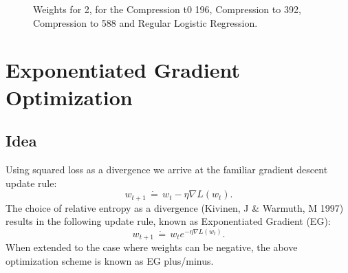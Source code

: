 \documentclass{asaproc}
\begin{document}
\begin{figure}[h!]
	\centering
	\caption{\enspace Weights for 2, for the Compression t0 196, Compression to 392, Compression to 588 and Regular Logistic Regression.}
	\label{fig5} 
\end{figure}

\section*{Exponentiated Gradient Optimization}

\subsection*{Idea}

Using squared loss as a divergence we arrive at the familiar gradient descent update rule:
$$ w_{t+1} \, \dot{=} \, w_t - \eta \nabla L(w_t). $$
The choice of relative entropy as a divergence (Kivinen, J \& Warmuth, M 1997) results in the following update rule, known as Exponentiated Gradient (EG):
$$ w_{t+1} \, \dot{=} \, w_t e^{-\eta \nabla L(w_t)}. $$
When extended to the case where weights can be negative, the above optimization scheme is known as EG plus/minus.
\end{document}
